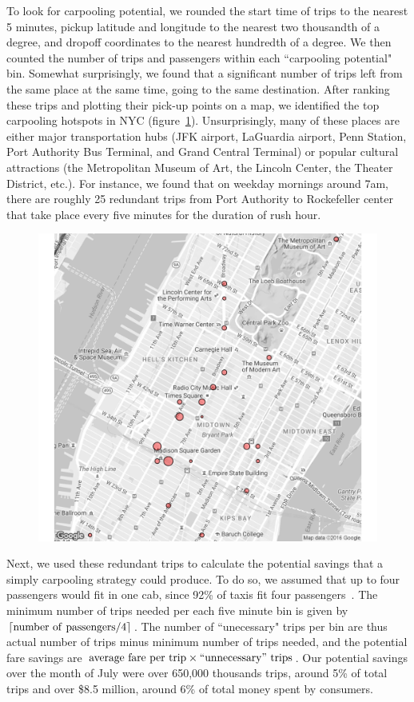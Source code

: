 \documentclass[twocolumn]{article}
\DeclarePairedDelimiter{\ceil}{\lceil}{\rceil}
\begin{document}
To look for carpooling potential, we rounded the start time of trips to the nearest 5 minutes, pickup latitude and longitude to the nearest two thousandth of a degree, and dropoff coordinates to the nearest hundredth of a degree. We then counted the number of trips and passengers within each ``carpooling potential" bin. Somewhat surprisingly, we found that a significant number of trips left from the same place at the same time, going to the same destination. After ranking these trips and plotting their pick-up points on a map, we identified the top carpooling hotspots in NYC (figure~\ref{fig:hotspots}). Unsurprisingly, many of these places are either major transportation hubs (JFK airport, LaGuardia airport, Penn Station, Port Authority Bus Terminal, and Grand Central Terminal) or popular cultural attractions (the Metropolitan Museum of Art, the Lincoln Center, the Theater District, etc.). For instance, we found that on weekday mornings around 7am, there are roughly 25 redundant trips from Port Authority to Rockefeller center that take place every five minutes for the duration of rush hour.
\begin{figure}[t]
  \centering
  \includegraphics[width=.9\linewidth]{top_25_hotspots}
  \label{fig:hotspots}
\end{figure}

Next, we used these redundant trips to calculate the potential savings that a simply carpooling strategy could produce. To do so, we assumed that up to four passengers would fit in one cab, since 92\% of taxis fit four passengers~\cite{TLC:2007}. The minimum number of trips needed per each five minute bin is given by $\ceil{\mathrm{number~of~passengers} / 4}$. The number of ``unecessary" trips per bin are thus actual number of trips minus minimum number of trips needed, and the potential fare savings are $\mathrm{average~fare~per~trip}\times\mathrm{``unnecessary"~trips}$. Our potential savings over the month of July were over 650,000 thousands trips, around 5\% of total trips and over \$8.5 million, around 6\% of total money spent by consumers.
\end{document}
